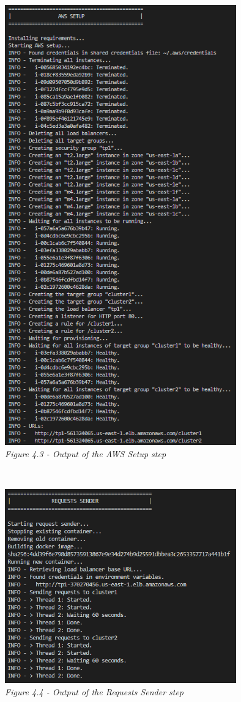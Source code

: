 \begin{center}\centering\includegraphics[width=10cm]{Resources/aws_setup.png}\\\emph{Figure 4.3 - Output of the AWS Setup step}\end{center}\\
\begin{center}\centering\includegraphics[width=10cm]{Resources/requests.png}\\\emph{Figure 4.4 - Output of the Requests Sender step}\end{center}\\

